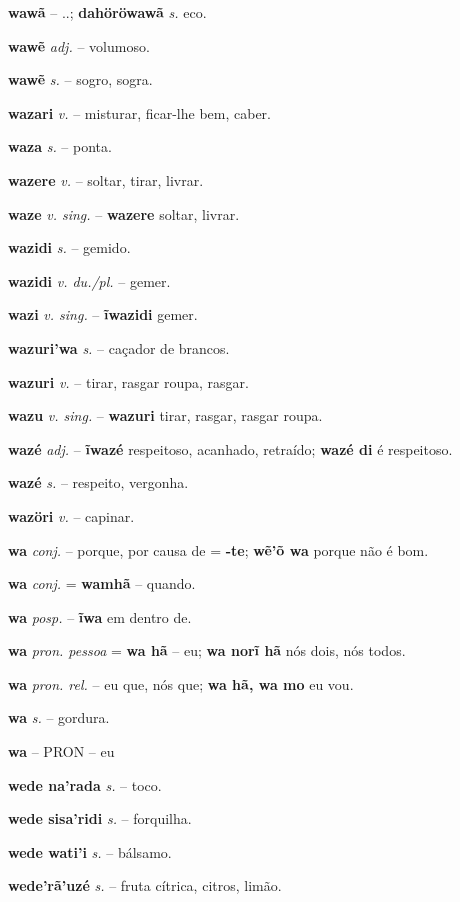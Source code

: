 \textbf{wawã} \textit{} -- ..; \textbf{dahöröwawã} \textit{s.} eco.

\textbf{wawẽ} \textit{adj.} -- volumoso.

\textbf{wawẽ} \textit{s.} -- sogro, sogra.

\textbf{wazari} \textit{v.} -- misturar, ficar-lhe bem, caber.

\textbf{waza} \textit{s.} -- ponta.

\textbf{wazere} \textit{v.} -- soltar, tirar, livrar.

\textbf{waze} \textit{v. sing.} -- \textbf{wazere} soltar, livrar.

\textbf{wazidi} \textit{s.} -- gemido.

\textbf{wazidi} \textit{v. du./pl.} -- gemer.

\textbf{wazi} \textit{v. sing.} -- \textbf{ĩwazidi} gemer.

\textbf{wazuri'wa} \textit{s.} -- caçador de brancos.

\textbf{wazuri} \textit{v.} -- tirar, rasgar roupa, rasgar.

\textbf{wazu} \textit{v. sing.} -- \textbf{wazuri} tirar, rasgar, rasgar roupa.

\textbf{wazé} \textit{adj.} -- \textbf{ĩwazé} respeitoso, acanhado, retraído; \textbf{wazé di} é respeitoso.

\textbf{wazé} \textit{s.} -- respeito, vergonha.

\textbf{wazöri} \textit{v.} -- capinar.

\textbf{wa} \textit{conj.} -- porque, por causa de = \textbf{-te}; \textbf{wẽ'õ wa} porque não é bom.

\textbf{wa} \textit{conj.} = \textbf{wamhã} -- quando.

\textbf{wa} \textit{posp.} -- \textbf{ĩwa} em dentro de.

\textbf{wa} \textit{pron. pessoa} = \textbf{wa hã} -- eu; \textbf{wa norĩ hã} nós dois, nós todos.

\textbf{wa} \textit{pron. rel.} -- eu que, nós que; \textbf{wa hã, wa mo} eu vou.

\textbf{wa} \textit{s.} -- gordura.

\textbf{wa} -- {PRON} -- {eu}

\textbf{wede na'rada} \textit{s.} -- toco.

\textbf{wede sisa'ridi} \textit{s.} -- forquilha.

\textbf{wede wati'i} \textit{s.} -- bálsamo.

\textbf{wede'rã'uzé} \textit{s.} -- fruta cítrica, citros, limão.

